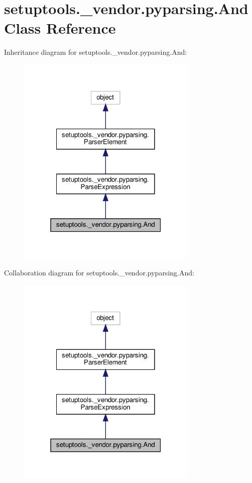 \hypertarget{classsetuptools_1_1__vendor_1_1pyparsing_1_1And}{}\section{setuptools.\+\_\+vendor.\+pyparsing.\+And Class Reference}
\label{classsetuptools_1_1__vendor_1_1pyparsing_1_1And}


Inheritance diagram for setuptools.\+\_\+vendor.\+pyparsing.\+And\+:
\nopagebreak
\begin{figure}[H]
\begin{center}
\leavevmode
\includegraphics[width=244pt]{classsetuptools_1_1__vendor_1_1pyparsing_1_1And__inherit__graph}
\end{center}
\end{figure}


Collaboration diagram for setuptools.\+\_\+vendor.\+pyparsing.\+And\+:
\nopagebreak
\begin{figure}[H]
\begin{center}
\leavevmode
\includegraphics[width=244pt]{classsetuptools_1_1__vendor_1_1pyparsing_1_1And__coll__graph}
\end{center}
\end{figure}
